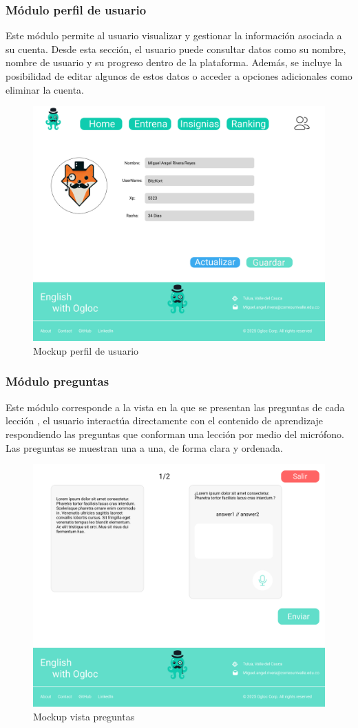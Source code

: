 \subsubsection{Módulo perfil de usuario}

Este módulo permite al usuario visualizar y gestionar la información asociada a su cuenta. Desde esta sección, el usuario puede consultar datos como su nombre, nombre de usuario y su progreso dentro de la plataforma. Además, se incluye la posibilidad de editar algunos de estos datos o acceder a opciones adicionales como eliminar la cuenta.

\begin{figure}[H]
  \centering
  \includegraphics[width=0.5\linewidth]{Imagenes/vista perfil.png}
  \caption{Mockup perfil de usuario}
  \label{fig:ER}
\end{figure}

\subsubsection{Módulo preguntas}

Este módulo corresponde a la vista en la que se presentan las preguntas de cada lección , el usuario interactúa directamente con el contenido de aprendizaje respondiendo las preguntas que conforman una lección por medio del micrófono. Las preguntas se muestran una a una, de forma clara y ordenada.

\begin{figure}[H]
  \centering
  \includegraphics[width=0.6\linewidth]{Imagenes/Vista preguntas.png}
  \caption{Mockup vista preguntas}
  \label{fig:ER}
\end{figure}

